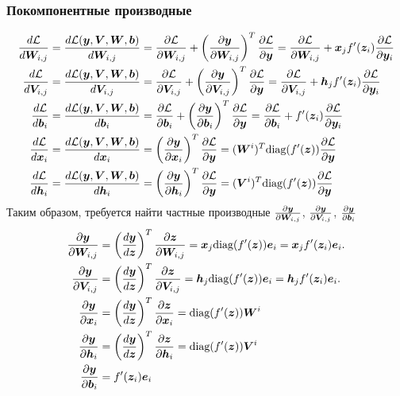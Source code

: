 \documentclass{report}
\numberwithin{theorem}{chapter}
\numberwithin{statement}{chapter}
\numberwithin{lemma}{chapter}
\theoremstyle{definition}
\numberwithin{task}{chapter}
\theoremstyle{remark}
\numberwithin{example}{chapter}
\theoremstyle{definition}
\numberwithin{definition}{chapter}
\theoremstyle{remark}
\theoremstyle{remark}
\numberwithin{lyrics}{section}
\begin{document}
\subsubsection{Покомпонентные производные}
\begin{align}
\frac{d\Loss}{d\boldW_{i,j}} & = \frac{d\Loss(\boldy, \boldV, \boldW, \boldb)}{d\boldW_{i,j}} = \partder{\Loss}{\boldW_{i, j}} + \left(\partder{\boldy}{\boldW_{i,j}}\right)^T \partder{\Loss}{\boldy} =  \partder{\Loss}{\boldW_{i, j}} + \boldx_j f'(\boldz_i) \partder{\Loss}{\boldy_i} \\ 
\frac{d\Loss}{d\boldV_{i,j}} & = \frac{d\Loss(\boldy, \boldV, \boldW, \boldb)}{d\boldV_{i,j}} = \partder{\Loss}{\boldV_{i, j}} + \left(\partder{\boldy}{\boldV_{i,j}}\right)^T \partder{\Loss}{\boldy} = \partder{\Loss}{\boldV_{i, j}} + \boldh_j f'(\boldz_i) \partder{\Loss}{\boldy_i} \\\
\frac{d\Loss}{d\boldb_{i}} & = \frac{d\Loss(\boldy, \boldV, \boldW, \boldb)}{d\boldb_{i}} = \partder{\Loss}{\boldb_i} + \left(\partder{\boldy}{\boldb_i}\right)^T \partder{\Loss}{\boldy} = \partder{\Loss}{\boldb_i} + f'(\boldz_i)\partder{\Loss}{\boldy_i} \ \\
\frac{d\Loss}{d\boldx_{i}} & = \frac{d\Loss(\boldy, \boldV, \boldW, \boldb)}{d\boldx_{i}} = \left(\partder{\boldy}{\boldx_i}\right)^T\partder{\Loss}{\boldy} =
(\boldW^i)^T \diag (f'(\boldz)) \partder{\Loss}{\boldy} \\
\frac{d\Loss}{d\boldh_{i}} & = \frac{d\Loss(\boldy, \boldV, \boldW, \boldb)}{d\boldh_{i}} = \left(\partder{\boldy}{\boldh_i}\right)^T\partder{\Loss}{\boldy} =
(\boldV^i)^T \diag (f'(\boldz))  \partder{\Loss}{\boldy} \\
\end{align}
Таким образом, требуется найти частные производные $\partder{\boldy}{\boldW_{i,j}}$, $\partder{\boldy}{\boldV_{i,j}}$, $\partder{\boldy}{\boldb_{i}}$
\begin{align*}
\partder{\boldy}{\boldW_{i,j}} &= \left(\frac{d\boldy}{d\boldz}\right)^T \frac{\partial\boldz}{\partial\boldW_{i, j}} =  \boldx_j \diag(f'(\boldz))\bolde_i =  \boldx_j  f'(\boldz_i) \bolde_i. \\
\frac{\partial \boldy}{\partial \boldV_{i, j}} &= \left(\frac{d\boldy}{d\boldz}\right)^T \frac{\partial\boldz}{\partial\boldV_{i, j}}  = \boldh_j \diag(f'(\boldz))  \bolde_i= \boldh_j f'(\boldz_i) \bolde_i.\\ 
\frac{\partial \boldy}{\partial \boldx_{i}} &= \left(\frac{d\boldy}{d\boldz}\right)^T \frac{\partial\boldz}{\partial\boldx_{i}} = \diag(f'(\boldz)) \boldW^i\\
\frac{\partial \boldy}{\partial \boldh_{i}} &= \left(\frac{d\boldy}{d\boldz}\right)^T \frac{\partial\boldz}{\partial\boldh_{i}} = \diag(f'(\boldz)) \boldV^i\\
\frac{\partial \boldy}{\partial \boldb_{i}} &= f'(\boldz_i)\bolde_i   \\
\end{align*}
\end{document}

